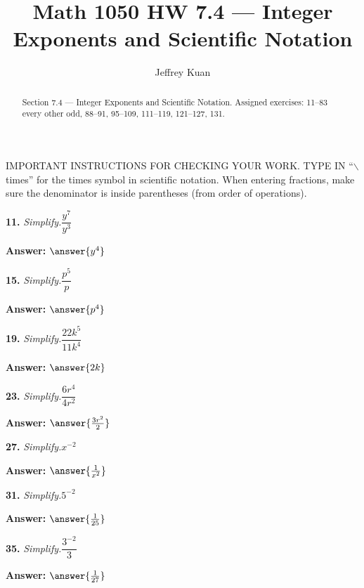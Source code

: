\documentclass{ximera}
\author{Jeffrey Kuan}
\title{Math 1050 HW 7.4 --- Integer Exponents and Scientific Notation}
\begin{document}
\begin{abstract}
    Section 7.4 --- Integer Exponents and Scientific Notation.
    Assigned exercises: 11–83 every other odd, 88–91, 95–109, 111–119, 121–127, 131.
\end{abstract}

\maketitle

IMPORTANT INSTRUCTIONS FOR CHECKING YOUR WORK. TYPE IN ``$\backslash$times'' for the times symbol in scientific notation. When entering fractions, make sure the denominator is inside parentheses (from order of operations).

\begin{problem}
\textbf{11.} \emph{Simplify.}\quad $\dfrac{y^7}{y^3}$

\textbf{Answer:} $\answer{y^4} $
\end{problem}

\begin{problem}
\textbf{15.} \emph{Simplify.}\quad $\dfrac{p^5}{p}$

\textbf{Answer:} $\answer{p^4} $
\end{problem}

\begin{problem}
\textbf{19.} \emph{Simplify.}\quad $\dfrac{22k^5}{11k^4}$

\textbf{Answer:} $\answer{2k}$
\end{problem}

\begin{problem}
\textbf{23.} \emph{Simplify.}\quad $\dfrac{6r^4}{4r^2}$

\textbf{Answer:} $\answer{\frac{3r^2}{2}}$
\end{problem}

\begin{problem}
\textbf{27.} \emph{Simplify.}\quad $x^{-2}$

\textbf{Answer:} $\answer{\frac{1}{x^2}}$
\end{problem}

\begin{problem}
\textbf{31.} \emph{Simplify.}\quad $5^{-2}$

\textbf{Answer:} $\answer{\frac{1}{25}}$
\end{problem}

\begin{problem}
\textbf{35.} \emph{Simplify.}\quad $\dfrac{3^{-2}}{3}$

\textbf{Answer:} $\answer{\frac{1}{27}}$
\end{problem}
\end{document}
